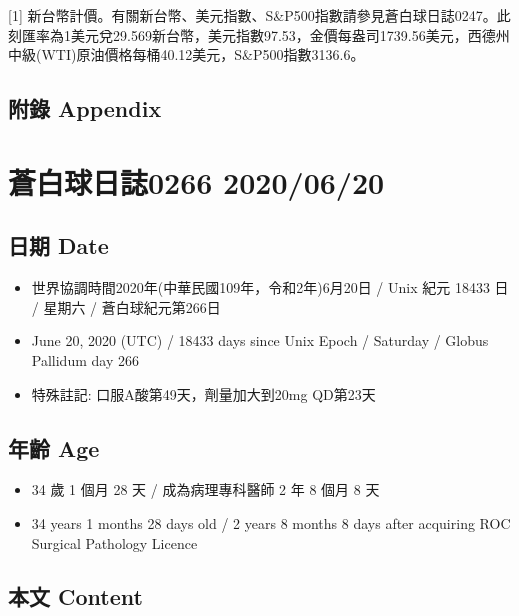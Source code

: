\documentclass[
]{article}
\providecommand{\tightlist}{%
  \setlength{\itemsep}{0pt}\setlength{\parskip}{0pt}}
\begin{document}
{[}1{]}
新台幣計價。有關新台幣、美元指數、S\&P500指數請參見蒼白球日誌0247。此刻匯率為1美元兌29.569新台幣，美元指數97.53，金價每盎司1739.56美元，西德州中級(WTI)原油價格每桶40.12美元，S\&P500指數3136.6。

\hypertarget{ux9644ux9304-appendix-16}{%
\subsection{附錄 Appendix}\label{ux9644ux9304-appendix-16}}

\hypertarget{ux84bcux767dux7403ux65e5ux8a8c0266-20200620}{%
\section{蒼白球日誌0266
2020/06/20}\label{ux84bcux767dux7403ux65e5ux8a8c0266-20200620}}

\hypertarget{ux65e5ux671f-date-17}{%
\subsection{日期 Date}\label{ux65e5ux671f-date-17}}

\begin{itemize}
\tightlist
\item
  世界協調時間2020年(中華民國109年，令和2年)6月20日 / Unix 紀元 18433 日
  / 星期六 / 蒼白球紀元第266日
\item
  June 20, 2020 (UTC) / 18433 days since Unix Epoch / Saturday / Globus
  Pallidum day 266
\item
  特殊註記: 口服A酸第49天，劑量加大到20mg QD第23天
\end{itemize}

\hypertarget{ux5e74ux9f61-age-17}{%
\subsection{年齡 Age}\label{ux5e74ux9f61-age-17}}

\begin{itemize}
\tightlist
\item
  34 歲 1 個月 28 天 / 成為病理專科醫師 2 年 8 個月 8 天
\item
  34 years 1 months 28 days old / 2 years 8 months 8 days after
  acquiring ROC Surgical Pathology Licence
\end{itemize}

\hypertarget{ux672cux6587-content-17}{%
\subsection{本文 Content}\label{ux672cux6587-content-17}}
\end{document}
